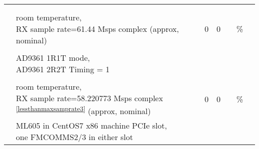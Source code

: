 \documentclass{article}
\begin{document}
\begin{landscape}
\begin{scriptsize}
\begin{longtable}{|c|l|c|c|c|c|l|}
                          &                                      &                                & &                                &                      & \\
                          &                                      &                                & &                                &                      & \\
                          & \multirow{2}{*}{\parbox{9.5cm}{\hspace*{15mm}room temperature, \\ \hspace*{15mm}RX sample rate=61.44 Msps complex (approx, nominal)}} & \multirow{2}{*}{0} & \multirow{2}{*}{0} & & \multirow{2}{*}{\%} & \\
                          &                                      &                                & &                                &                      & \\
                          &                                      &                                & &                                &                      & \\
                          & \multirow{2}{*}{\parbox{9.5 cm}{\hspace*{12mm}AD9361 1R1T mode, \\ \hspace*{12mm}AD9361 2R2T Timing = 1}} & & & & & \\
                          &                                      &                                & &                                &                      & \\
                          &                                      &                                & &                                &                      & \\
                          & \multirow{2}{*}{\parbox{9.5cm}{\hspace*{15mm}room temperature, \\ \hspace*{15mm}RX sample rate=58.220773 Msps complex \textsuperscript{\ref{lessthanmaxsamprate3}} (approx, nominal)}} & \multirow{2}{*}{0} & \multirow{2}{*}{0} & & \multirow{2}{*}{\%} & \multirow{2}{*}{} \\
                          &                                      &                                & &                                &                      & \\
    \cline{2-6}
                          & \parbox{9.5cm}{ML605 in CentOS7 x86 machine PCIe slot, \\ one FMCOMMS2/3 in either slot} & & & & & \\

\end{longtable}
\end{scriptsize}
\end{landscape}
\end{document}
